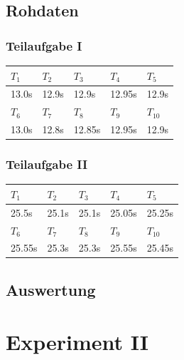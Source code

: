\documentclass[12pt,a4paper]{article}
\begin{document}
\subsection*{Rohdaten}
\subsubsection*{Teilaufgabe I}
\begin{tabular}{|l|l|l|l|l|}
\hline
$T_{1}$&$T_{2}$&$T_{3}$&$T_{4}$&$T_{5}$\\
\hline
13.0s&12.9s&12.9s&12.95s&12.9s\\
\hline
\hline
$T_{6}$&$T_{7}$&$T_{8}$&$T_{9}$&$T_{10}$\\
\hline
13.0s&12.8s&12.85s&12.95s&12.9s\\
\hline
\end{tabular}

\subsubsection*{Teilaufgabe II}
\begin{tabular}{|l|l|l|l|l|}
\hline
$T_{1}$&$T_{2}$&$T_{3}$&$T_{4}$&$T_{5}$\\
\hline
25.5s&25.1s&25.1s&25.05s&25.25s\\
\hline
\hline
$T_{6}$&$T_{7}$&$T_{8}$&$T_{9}$&$T_{10}$\\
\hline
25.55s&25.3s&25.3s&25.55s&25.45s\\
\hline
\end{tabular}

\subsection*{Auswertung}


\section*{Experiment II}
\end{document}
